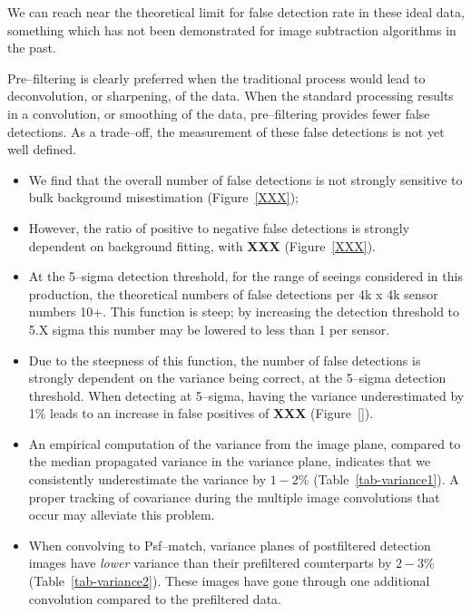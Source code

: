\documentclass[prd, nofootinbib, floatfix, 11pt,tightenlines,times]{article}
\begin{document}
We can reach near the theoretical limit for false detection rate in
these ideal data, something which has not been demonstrated for image
subtraction algorithms in the past.

Pre--filtering is clearly preferred when the traditional process would
lead to deconvolution, or sharpening, of the data.  When the standard
processing results in a convolution, or smoothing of the data,
pre--filtering provides fewer false detections.  As a trade--off, the
measurement of these false detections is not yet well defined.

\begin{itemize}

\item We find that the overall number of false detections is not
  strongly sensitive to bulk background misestimation
  (Figure~\ref{XXX});

\item However, the ratio of positive to negative false detections is
  strongly dependent on background fitting, with {\bf XXX}
  (Figure~\ref{XXX}).

\item At the 5--sigma detection threshold, for the range of seeings
  considered in this production, the theoretical numbers of false
  detections per 4k x 4k sensor numbers 10+.  This function is steep;
  by increasing the detection threshold to 5.X sigma this number may
  be lowered to less than 1 per sensor.

\item Due to the steepness of this function, the number of false
  detections is strongly dependent on the variance being correct, at
  the 5--sigma detection threshold.  When detecting at 5--sigma,
  having the variance underestimated by 1\% leads to an increase
  in false positives of {\bf XXX} (Figure~\ref{}).

\item An empirical computation of the variance from the image plane,
  compared to the median propagated variance in the variance plane,
  indicates that we consistently underestimate the variance by $1-2\%$
  (Table~\ref{tab-variance1}).  A proper tracking of covariance during
  the multiple image convolutions that occur may alleviate this
  problem.

\item When convolving to Psf--match, variance planes of postfiltered
  detection images have {\it lower} variance than their prefiltered
  counterparts by $2-3\%$ (Table~\ref{tab-variance2}).  These images
  have gone through one additional convolution compared to the
  prefiltered data.


\end{itemize}
\end{document}

